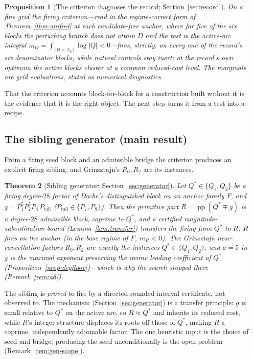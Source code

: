 \documentclass[11pt,reqno]{amsart}
\theoremstyle{plain}
\newtheorem{theorem}{Theorem}
\newtheorem{proposition}[theorem]{Proposition}
\theoremstyle{definition}
\DeclareMathOperator{\pp}{pp}
\begin{document}
\begin{proposition}[The criterion diagnoses the record; Section~\ref{sec:record}]
\label{thm:record}
On a fine grid the firing criterion---read in the regime-correct form of
Theorem~\ref{thm:unified} at each candidate-free anchor, where for five of the six blocks
the perturbing branch does not attain $D$ and the test is the active-arc integral
$m_Q=\int_{\{B>A_0\}}\log|Q|<0$---fires, strictly, on every one of the record's six
denominator blocks, while natural controls stay inert; at the record's own optimum the
active blocks cluster at a common reduced-cost level. The marginals are grid evaluations,
stated as numerical diagnostics.
\end{proposition}

That the criterion accounts block-for-block for a construction built without it is the
evidence that it is the right object. The next step turns it from a test into a recipe.

\subsection*{The sibling generator (main result)}
From a firing seed block and an admissible bridge the criterion produces an explicit
firing sibling, and Grinsztajn's $R_0,R_2$ are its instances.

\begin{theorem}[Sibling generator; Section~\ref{sec:generator}]\label{thm:gen-intro}
Let $Q^*\in\{Q_1,Q_2\}$ be a firing degree-$28$ factor of Doche's distinguished block on
an anchor family $F$, and $g=P_1^5P_2^5P_4\,P_{\mathrm{tail}}$ ($P_{\mathrm{tail}}\in\{P_7,P_8\}$).
Then the primitive part $R=\pp(Q^*\mp g)$ is a degree-$28$ admissible block, coprime to
$Q^*$, and a certified magnitude-subordination bound (Lemma~\ref{lem:transfer})
transfers the firing from $Q^*$ to $R$: $R$ fires on the anchor (in the base regime of
$F$, $m_R<0$). The Grinsztajn near-cancellation factors $R_0,R_2$ are exactly the
instances $Q^*\in\{Q_1,Q_2\}$, and $a=5$ in $g$ is the maximal exponent preserving the
monic leading coefficient of $Q^*$ (Proposition~\ref{prop:degfloor})---which is why the
search stopped there (Remark~\ref{rem:a6}).
\end{theorem}

The sibling is \emph{proved} to fire by a directed-rounded interval certificate, not
observed to. The mechanism (Section~\ref{sec:generator}) is a transfer principle: $g$ is
small relative to $Q^*$ on the active arc, so $R\approx Q^*$ and inherits its reduced
cost, while $R$'s integer structure displaces its roots off those of $Q^*$, making $R$ a
coprime, independently adjoinable factor. The one heuristic input is the choice of seed
and bridge; producing the seed unconditionally is the open problem
(Remark~\ref{rem:gen-scope}).
\end{document}
